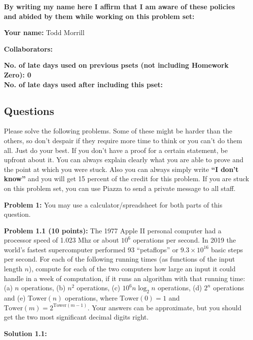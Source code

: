 \documentclass[11pt]{article}
\begin{document}
	\textbf{By writing my name here I affirm that I am aware of these policies
		and abided by them while working on this problem set:}

	\textbf{Your name:} Todd Morrill

	\textbf{Collaborators:}

	\textbf{No. of late days used on previous psets (not including Homework Zero): 0
}\\
	\textbf{No. of late days used after including this pset: %
}


	\newpage


	\subsection*{Questions}\label{questions}

{	\color{red}
Please solve the following problems. Some of these might be harder than
the others, so don't despair if they require more time to think or you
can't do them all. Just do your best. If you don't have a proof
for a certain statement, be upfront about it. You can always explain
clearly what you are able to prove and the point at which you were
stuck. Also you can always simply write
\textbf{``I don't know''} and you will get 15 percent of the credit for
this problem. If you are stuck on this problem set, you can use Piazza to
send a private message to all staff.

}

\newpage

\newcommand{\Tower}{\mathrm{Tower}}
\textbf{Problem 1:} You may use a calculator/spreadsheet for both parts of this question.

\textbf{Problem 1.1 (10 points):} The 1977 Apple II personal computer had a processor
speed of 1.023 Mhz or about $10^6$ operations per second. In 2019 the world’s fastest supercomputer performed 93
“petaflops”  or $9.3 \times 10^{16}$
basic steps per second. For each of the following running times
(as functions of the input length $n$), compute for each of the two computers how
large an input it could handle in a week of computation, if it runs
an algorithm with that running time: (a) $n$ operations, (b) $n^2$ operations, (c) $10^6 n \log_2 n$ operations, (d) $2^n$ operations and (e) $\Tower(n)$ operations, where $\Tower(0) = 1$ and $\Tower(m) = 2^{\Tower(m-1)}$. Your answers can be approximate, but you should get the two most significant decimal digits right.

\textbf{Solution 1.1:} %
\end{document}
